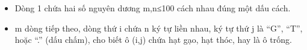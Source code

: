 \begin{itemize}
	\item     Dòng 1 chứa hai số nguyên dương m,n≤100 cách nhau đúng một dấu cách.   
	\item     m dòng tiếp theo, dòng thứ i chứa n ký tự liền nhau, ký tự thứ j là “G”, “T”, hoặc “.” (dấu chấm), cho biết ô (i,j) chứa hạt gạo, hạt thóc, hay là ô trống.   
\end{itemize}

\